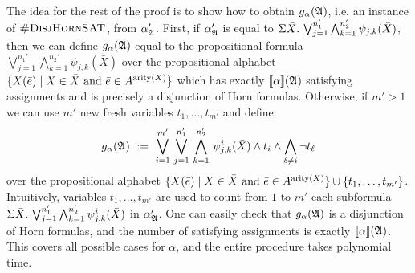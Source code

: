 The idea for the rest of the proof is to show how to obtain $g_{\alpha}(\mathfrak{A})$, i.e. an instance of $\textsc{\#DisjHornSAT}$, from $\alpha_{\mathfrak{A}}'$.
First, if $\alpha_{\mathfrak{A}}'$ is equal to $\Sigma{\bar{X}}.\,\bigvee_{j = 1}^{n_1'}\bigwedge_{k = 1}^{n_2'}\psi_{j,k}(\bar{X})$, then we can define $g_{\alpha}(\mathfrak{A})$ equal to the propositional formula $\bigvee_{j = 1}^{n_1'}\bigwedge_{k = 1}^{n_2'}\psi_{j,k}(\bar{X})$ over the propositional alphabet $\{X(\bar{e}) \mid X \in \bar{X} \text{ and } \bar{e}\in A^{{\rm arity}(X)} \}$ which has exactly ${\llbracket{}{\alpha}\rrbracket}(\mathfrak{A})$ satisfying assignments and is precisely a disjunction of Horn formulas.
Otherwise, if $m' > 1$ we can use $m'$ new fresh variables $t_1,\ldots,t_{m'}$ and define:
$$
g_{\alpha}(\A) \ := \ \bigvee_{i=1}^{m'} \, \bigvee_{j = 1}^{n_1'} \, \bigwedge_{k = 1}^{n_2'} \, \psi^i_{j,k}(\bar{X}) \wedge t_i \wedge \bigwedge_{\ell \neq i} \neg t_{\ell}
$$ 
over the propositional alphabet $\{X(\bar{e}) \mid X \in \bar{X} \text{ and } \bar{e}\in A^{{\rm arity}(X)} \} \cup \{t_1,\ldots,t_{m'}\}$.
Intuitively, variables $t_1,\ldots,t_{m'}$ are used to count from $1$ to $m'$ each subformula $\Sigma{\bar{X}}.\,\bigvee_{j = 1}^{n_1'}\bigwedge_{k = 1}^{n_2'}\psi^{i}_{j,k}(\bar{X})$ in $\alpha_{\mathfrak{A}}'$.
One can easily check that $g_{\alpha}(\mathfrak{A})$ is a disjunction of Horn formulas, and the number of satisfying assignments is exactly ${\llbracket{}{\alpha}\rrbracket}(\mathfrak{A})$. This covers all possible cases for $\alpha$, and the entire procedure takes polynomial time.

